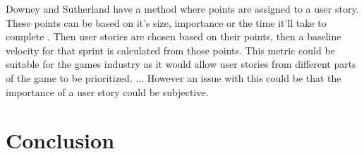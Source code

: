 \documentclass{scrartcl}
\begin{document}
Downey and Sutherland have a method where points are assigned to a user story. These points can be based on it's size, importance or the time it'll take to complete \cite{Downey}. Then user stories are chosen based on their points, then a baseline velocity for that sprint is calculated from those points. This metric could be suitable for the games industry as it would allow user stories from different parts of the game to be prioritized. ... However an issue with this could be that the importance of a user story could be subjective. 






\section{Conclusion}
	


	
\end{document}
